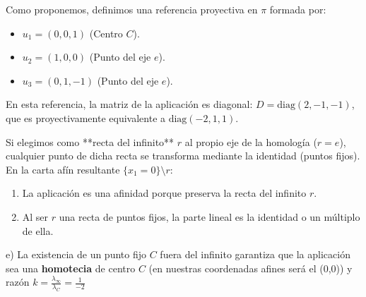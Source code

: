 {Como proponemos, definimos una referencia proyectiva en $\pi$ formada por:
\begin{itemize}
    \item $u_1 = (0, 0, 1)$ (Centro $C$).
    \item $u_2 = (1, 0, 0)$ (Punto del eje $e$).
    \item $u_3 = (0, 1, -1)$ (Punto del eje $e$).
\end{itemize}
En esta referencia, la matriz de la aplicación es diagonal: $D = \text{diag}(2, -1, -1)$, que es proyectivamente equivalente a $\text{diag}(-2, 1, 1)$. 

Si elegimos como **recta del infinito** $r$ al propio eje de la homología ($r = e$), cualquier punto de dicha recta se transforma mediante la identidad (puntos fijos). En la carta afín resultante $\{x_1 = 0\} \setminus r$:
\begin{enumerate}
    \item La aplicación es una afinidad porque preserva la recta del infinito $r$.
    \item Al ser $r$ una recta de puntos fijos, la parte lineal es la identidad o un múltiplo de ella.
\end{enumerate}
e) La existencia de un punto fijo $C$ fuera del infinito garantiza que la aplicación sea una \textbf{homotecia} de centro $C$ (en nuestras coordenadas afines será el (0,0)) y razón $k = \frac{\lambda_\infty}{\lambda_C} = \frac{1}{-2}$
}

